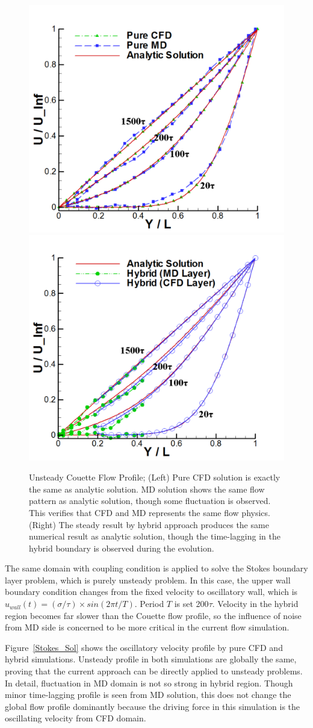 \documentclass{CFD2010paper}
\begin{document}
%
\begin{figure}[ht]
\centering
\includegraphics[width=0.4\linewidth]{Flat_Plate_Sol1.pdf}
\hskip 1cm
\includegraphics[width=0.4\linewidth]{Flat_Plate_Sol2.pdf}
\vskip-0.2cm
\caption{Unsteady Couette Flow Profile; (Left) Pure CFD solution is exactly the same as analytic solution. MD solution shows the same flow pattern as analytic solution, though some fluctuation is observed. This verifies that CFD and MD represents the same flow physics. (Right) The steady result by hybrid approach produces the same numerical result as analytic solution, though the time-lagging in the hybrid boundary is observed during the evolution.}
\label{Flat_Plate_Sol}
\end{figure}



The same domain with coupling condition is applied to solve the Stokes boundary layer problem, which is purely unsteady problem. In this case, the upper wall boundary condition changes from the fixed velocity to oscillatory wall, which is $u_{wall}(t)=({\sigma}/{\tau}){\times}sin(2{\pi}t/T)$. Period $T$ is set 200$\tau$. Velocity in the hybrid region becomes far slower than the Couette flow profile, so the influence of noise from MD side is concerned to be more critical in the current flow simulation.

Figure~\ref{Stokes_Sol} shows the oscillatory velocity profile by pure CFD and hybrid simulations. Unsteady profile in both simulations are globally the same, proving that the current approach can be directly applied to unsteady problems. In detail, fluctuation in MD domain is not so strong in hybrid region. Though minor time-lagging profile is seen from MD solution, this does not change the global flow profile dominantly because the driving force in this simulation is the oscillating velocity from CFD domain.
\end{document}
